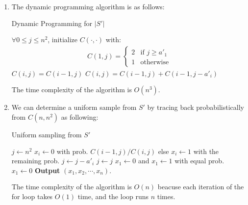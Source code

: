 \begin{answer}
\begin{enumerate}[label=\alph*).]
        \item The dynamic programming algorithm is as follows:
        \begin{algo}
            \caption{Dynamic Programming for $|S'|$}
            \label{alg:2.dp}
            \begin{algorithmic}[1]
                \State $\forall 0\le j \le n^2$, initialize $C(\cdot, \cdot)$ with: 
                \begin{align*}
                    C(1, j) = \begin{cases}
                        2 & \text{if } j \ge a'_1 \\
                        1 & \text{otherwise}
                    \end{cases}
                \end{align*}
                 
                            \State $C(i,j) = C(i-1,j)$
                        \Else
                            \State $C(i,j) = C(i-1,j) + C(i-1,j-a'_i)$
                        \EndIf
                    \EndFor
                \EndFor
            \end{algorithmic}
        \end{algo}
        The time complexity of the algorithm is $O(n^3)$. 
        \item We can determine a uniform sample from $S'$ by tracing back probabilistically from $C(n,n^2)$ as following:
        \begin{algo}
            \caption{Uniform sampling from $S'$}
            \label{alg:2.sample}
            \begin{algorithmic}[1]
                \State $j \gets n^2$
                    \State $x_i \gets 0$ with prob. $C(i-1,j)/C(i,j)$ else $x_i \gets 1$ with the remaining prob.
                        \State $j \gets j - a'_i$ 
                    \Else 
                        \State $j \gets j$ 
                    \EndIf
                \EndFor
                 
                    \State $x_1 \gets 0$ and $x_1 \gets 1$ with equal prob.
                \Else
                    \State $x_1 \gets 0$ 
                \EndIf
                \State \textbf{Output} $(x_1, x_2, \cdots, x_n)$.
            \end{algorithmic}                
        \end{algo}
        The time complexity of the algorithm is $O(n)$ beacuse each iteration of the for loop takes $O(1)$ time, and the loop runs $n$ times.
    \end{enumerate}
    \ed
\end{answer}
